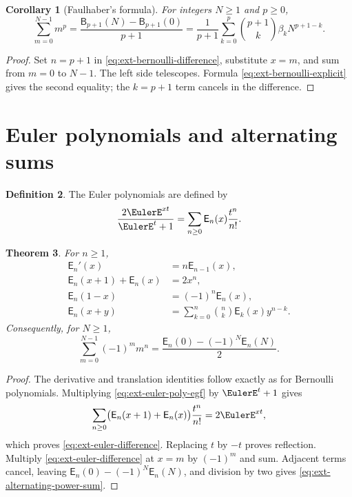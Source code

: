 \documentclass[11pt,a4paper,oneside,openany]{book}
\newtheorem{theorem}{Theorem}[chapter]
\newtheorem{corollary}[theorem]{Corollary}
\theoremstyle{definition}
\newtheorem{definition}[theorem]{Definition}
\theoremstyle{remark}
\begin{document}
\begin{corollary}[Faulhaber's formula]
For integers \(N\ge1\) and \(p\ge0\),
\begin{equation}\label{eq:ext-faulhaber}
 \sum_{m=0}^{N-1}m^p
 =\frac{\mathsf B_{p+1}(N)-\mathsf B_{p+1}(0)}{p+1}
 =\frac1{p+1}\sum_{k=0}^{p}\binom{p+1}{k}\beta_kN^{p+1-k}.
\end{equation}
\end{corollary}
\begin{proof}
Set \(n=p+1\) in \eqref{eq:ext-bernoulli-difference}, substitute
\(x=m\), and sum from \(m=0\) to \(N-1\).  The left side telescopes.
Formula \eqref{eq:ext-bernoulli-explicit} gives the second equality; the
\(k=p+1\) term cancels in the difference.
\end{proof}

\section{Euler polynomials and alternating sums}

\begin{definition}
The Euler polynomials are defined by
\begin{equation}\label{eq:ext-euler-poly-egf}
 \frac{2\EulerE^{xt}}{\EulerE^t+1}
 =\sum_{n\ge0}\mathsf E_n(x)\frac{t^n}{n!}.
\end{equation}
\end{definition}

\begin{theorem}
For \(n\ge1\),
\begin{align}
 \mathsf E_n'(x)&=n\mathsf E_{n-1}(x),\label{eq:ext-euler-derivative}\\
 \mathsf E_n(x+1)+\mathsf E_n(x)&=2x^n,\label{eq:ext-euler-difference}\\
 \mathsf E_n(1-x)&=(-1)^n\mathsf E_n(x),\label{eq:ext-euler-reflection}\\
 \mathsf E_n(x+y)&=\sum_{k=0}^n\binom nk\mathsf E_k(x)y^{n-k}.
 \label{eq:ext-euler-translation}
\end{align}
Consequently, for \(N\ge1\),
\begin{equation}\label{eq:ext-alternating-power-sum}
 \sum_{m=0}^{N-1}(-1)^m m^n
 =\frac{\mathsf E_n(0)-(-1)^N\mathsf E_n(N)}2.
\end{equation}
\end{theorem}
\begin{proof}
The derivative and translation identities follow exactly as for Bernoulli
polynomials.  Multiplying \eqref{eq:ext-euler-poly-egf} by \(\EulerE^t+1\) gives
\[
 \sum_{n\ge0}\bigl(\mathsf E_n(x+1)+\mathsf E_n(x)\bigr)\frac{t^n}{n!}
 =2\EulerE^{xt},
\]
which proves \eqref{eq:ext-euler-difference}.  Replacing \(t\) by \(-t\)
proves reflection.  Multiply \eqref{eq:ext-euler-difference} at \(x=m\) by
\((-1)^m\) and sum.  Adjacent terms cancel, leaving
\(\mathsf E_n(0)-(-1)^N\mathsf E_n(N)\), and division by two gives
\eqref{eq:ext-alternating-power-sum}.
\end{proof}
\end{document}
